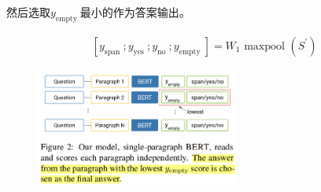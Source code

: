 \documentclass[a4paper,UTF8]{article}
\numberwithin{equation}{section}
\begin{document}
	然后选取$y_{\text {empty }}$最小的作为答案输出。

	\begin{align}
		\left[y_{\text {span }} ; y_{\text {yes }} ; y_{\text {no }} ; y_{\text {empty }}\right]=W_{1} \text { maxpool }\left(S^{\prime}\right)
		\end{align}
		\begin{figure}[H]
			\centering
			\includegraphics[width=0.6\textwidth]{4-1.png}
		\end{figure}

\newpage
\end{document}
